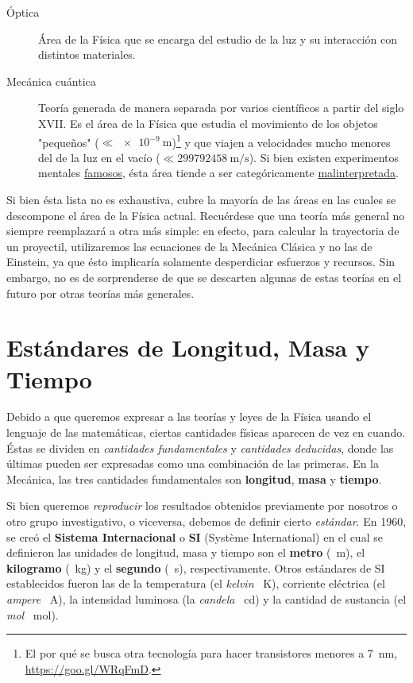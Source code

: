 \begin{description}
    \item [\'Optica] \'Area de la F\'isica que se encarga del estudio de la luz y su interacci\'on con distintos materiales.
    \item [Mec\'anica cu\'antica] Teor\'ia generada de manera separada por varios cient\'ificos a partir del siglo XVII. Es el \'area de la F\'isica que estudia el movimiento de los objetos "peque\~nos" ($\ll\SI{e-9}{\meter}$)\footnote{El por qu\'e se busca otra tecnolog\'ia para hacer transistores menores a \SI{7}{\nano\meter}, \href{https://goo.gl/WRqFmD}{https://goo.gl/WRqFmD}. } y que viajen a velocidades mucho menores del de la luz en el vac\'io  ($\ll\SI{299792458}{\meter/\second}$). Si bien existen experimentos mentales \href{http://www.fisicafundamental.net/misterios/gato.html}{famosos}, \'esta \'area tiende a ser categ\'oricamente   \href{http://cosmology.com/ConsciousTime107.html}{malinterpretada}.
\end{description}

Si bien \'esta lista no es exhaustiva, cubre la mayor\'ia de las \'areas en las cuales se descompone el \'area de la F\'isica actual. Recu\'erdese que una teor\'ia m\'as general no siempre reemplazar\'a a otra m\'as simple: en efecto, para calcular la trayectoria de un proyectil, utilizaremos las ecuaciones de la Mec\'anica Cl\'asica y no las de Einstein, ya que \'esto implicar\'ia solamente desperdiciar esfuerzos y recursos. Sin embargo, no es de sorprenderse de que se descarten algunas de estas teor\'ias en el futuro por otras teor\'ias m\'as generales.

%
\section{Est\'andares de Longitud, Masa y Tiempo}\label{sec:estandares1}
%

Debido a que queremos expresar a las teor\'ias y leyes de la F\'isica usando el lenguaje de las matem\'aticas, ciertas cantidades f\'isicas aparecen de vez en cuando. \'Estas se dividen en \emph{cantidades fundamentales} y \emph{cantidades deducidas}, donde las \'ultimas pueden ser expresadas como una combinaci\'on de las primeras. En la Mec\'anica, las tres cantidades fundamentales son \textbf{longitud}, \textbf{masa} y \textbf{tiempo}.

Si bien queremos \emph{reproducir} los resultados obtenidos previamente por nosotros o otro grupo investigativo, o viceversa, debemos de definir cierto \emph{est\'andar}. En 1960, se cre\'o el \textbf{Sistema Internacional} o \textbf{SI} (Syst\`eme International) en el cual se definieron las unidades de longitud, masa y tiempo son el \textbf{metro} (\SI{}{\meter}), el \textbf{kilogramo} (\SI{}{\kilogram}) y el \textbf{segundo} (\SI{}{\second}), respectivamente. Otros est\'andares de SI establecidos fueron las de la temperatura (el \emph{kelvin} \SI{}{\kelvin}), corriente el\'ectrica (el \emph{ampere} \SI{}{\ampere}), la intensidad luminosa (la \emph{candela} \SI{}{\candela}) y la cantidad de sustancia (el \emph{mol} \SI{}{\mole}).

